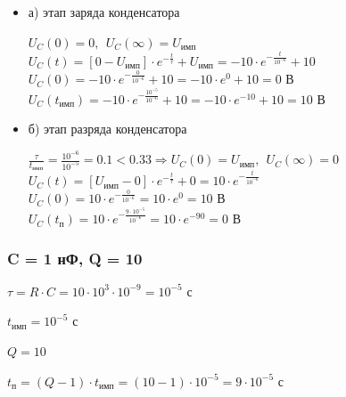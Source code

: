 \documentclass[a4paper,14pt]{extarticle}
\begin{document}
\begin{itemize}
	\item[] а) этап заряда конденсатора

	$U_C(0) = 0,\ \ U_C(\infty) = U_\text{имп}$\\
	$U_C(t) = [0 - U_\text{имп}] \cdot e^{-\frac{t}{\tau}} + U_\text{имп} = -10 \cdot e^{-\frac{t}{10^{-6}}} + 10$\\
	$U_C(0) = -10 \cdot e^{-\frac{0}{10^{-6}}} + 10 = -10 \cdot e^0 + 10 = 0 \text{ В}$\\
	$U_C(t_\text{имп}) = -10 \cdot e^{-\frac{10^{-5}}{10^{-6}}} + 10 = -10 \cdot e^{-10} + 10 = 10 \text{ В}$

	\item[] б) этап разряда конденсатора
	
	$\frac{\tau}{t_\text{имп}} = \frac{10^{-6}}{10^{-5}} = 0.1 < 0.33 \Rightarrow U_C(0) = U_\text{имп},\ \ U_C(\infty) = 0$\\
	$U_C(t) = [U_\text{имп} - 0] \cdot e^{-\frac{t}{\tau}} + 0 = 10 \cdot e^{-\frac{t}{10^{-6}}}$\\
	$U_C(0) = 10 \cdot e^{-\frac{0}{10^{-6}}} = 10 \cdot e^0 = 10 \text{ В}$\\
	$U_C(t_\text{п}) = 10 \cdot e^{-\frac{9 \cdot 10^{-5}}{10^{-6}}} = 10 \cdot e^{-90} = 0 \text{ В}$
\end{itemize}

\subsubsection{C = 1 нФ, Q = 10}

$\tau = R \cdot C = 10 \cdot 10^3 \cdot 10^{-9} = 10^{-5} \text{ с}$

$t_\text{имп} = 10^{-5} \text{ с}$

$Q = 10$		

$t_\text{п} = (Q - 1) \cdot t_\text{имп} = (10 - 1) \cdot 10^{-5} = 9 \cdot 10^{-5} \text{ с}$
\end{document}
